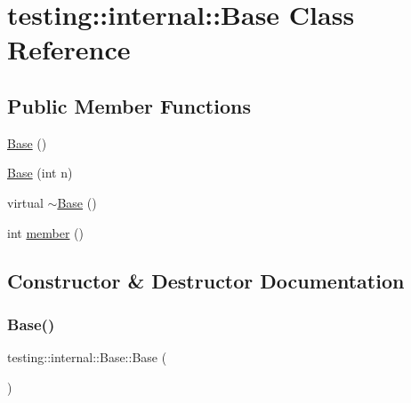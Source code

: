 \hypertarget{classtesting_1_1internal_1_1Base}{}\section{testing\+::internal\+::Base Class Reference}
\label{classtesting_1_1internal_1_1Base}
\subsection*{Public Member Functions}
\begin{DoxyCompactItemize}
\item 
\mbox{\hyperlink{classtesting_1_1internal_1_1Base_a6b29f1a7192b126e6fa0aae31200b5ca}{Base}} ()
\item 
\mbox{\hyperlink{classtesting_1_1internal_1_1Base_a255d105410a1eeb5f4690c9c8cd8e104}{Base}} (int n)
\item 
virtual \mbox{\hyperlink{classtesting_1_1internal_1_1Base_afb29c9032fb50cc6520014aad9d68328}{$\sim$\+Base}} ()
\item 
int \mbox{\hyperlink{classtesting_1_1internal_1_1Base_a7ddba6221b56613be545544b7ef6214c}{member}} ()
\end{DoxyCompactItemize}


\subsection{Constructor \& Destructor Documentation}
\mbox{\label{classtesting_1_1internal_1_1Base_a6b29f1a7192b126e6fa0aae31200b5ca}} 
\subsubsection{\texorpdfstring{Base()}{Base()}\hspace{0.1cm}{\footnotesize\ttfamily [1/2]}}
{\footnotesize\ttfamily testing\+::internal\+::\+Base\+::\+Base (\begin{DoxyParamCaption}{ }\end{DoxyParamCaption})\hspace{0.3cm}{\ttfamily [inline]}}

\mbox{\label{classtesting_1_1internal_1_1Base_a255d105410a1eeb5f4690c9c8cd8e104}} 
